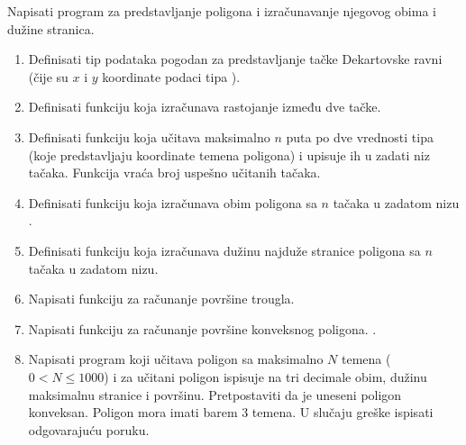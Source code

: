 \begin{Exercise}[label=struc.10] 
Napisati program za predstavljanje poligona i izračunavanje njegovog
obima i dužine stranica.
\begin{enumerate}
\item Definisati tip podataka  pogodan za predstavljanje
  tačke Dekartovske ravni (čije su $x$ i $y$ koordinate podaci tipa
  ).

\item Definisati funkciju 
  koja izračunava rastojanje između dve tačke.

\item Definisati funkciju  koja učitava maksimalno $n$ puta po dve
  vrednosti tipa  (koje predstavljaju koordinate temena
  poligona) i upisuje ih u zadati niz tačaka. Funkcija vraća broj
  uspešno učitanih tačaka.

\item Definisati funkciju  koja izračunava obim poligona sa $n$ tačaka u zadatom nizu
  .

\item Definisati funkciju  koja izračunava dužinu najduže stranice
  poligona sa $n$ tačaka u zadatom nizu.

\item Napisati funkciju  za računanje površine trougla.

\item Napisati funkciju  za računanje površine konveksnog
  poligona. .

\item Napisati program koji učitava poligon sa maksimalno $N$ temena
  ($0 < N \le 1000$) i za učitani poligon ispisuje na tri decimale
  obim, dužinu maksimalnu stranice i površinu. Pretpostaviti da je
  uneseni poligon konveksan. Poligon mora imati barem $3$ temena. U
  slučaju greške ispisati odgovarajuću poruku.
\end{enumerate}


\end{Exercise}
